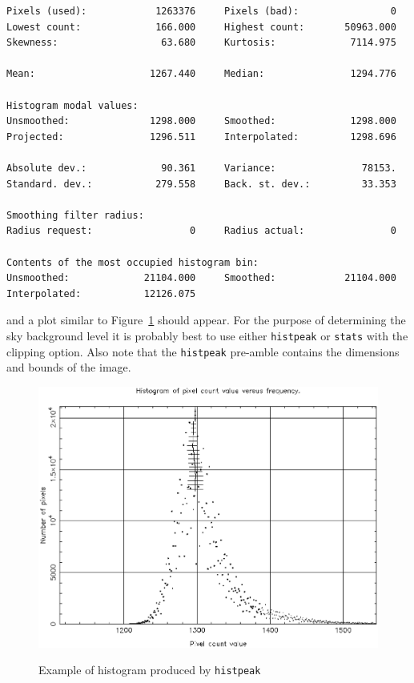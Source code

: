 \documentclass[twoside,11pt]{article}
\begin{document}
\begin{enumerate}
\begin{verbatim}
Pixels (used):            1263376     Pixels (bad):                0
Lowest count:             166.000     Highest count:       50963.000
Skewness:                  63.680     Kurtosis:             7114.975

Mean:                    1267.440     Median:               1294.776

Histogram modal values:
Unsmoothed:              1298.000     Smoothed:             1298.000
Projected:               1296.511     Interpolated:         1298.696

Absolute dev.:             90.361     Variance:               78153.
Standard. dev.:           279.558     Back. st. dev.:         33.353

Smoothing filter radius:
Radius request:                 0     Radius actual:               0

Contents of the most occupied histogram bin:
Unsmoothed:             21104.000     Smoothed:            21104.000
Interpolated:           12126.075
\end{verbatim}

   and a plot similar to Figure~\ref{HISTPEAK} should appear.  For the
   purpose of determining the sky background level it is probably best
   to use either {\tt histpeak} or {\tt stats} with the clipping option.
   Also note that the {\tt histpeak} pre-amble contains the dimensions and
   bounds of the image.

\end{enumerate}

\begin{figure}[htbp]
   \centering 
   \includegraphics[totalheight=4in]{sc5_histpeak.ps}
   \begin{quote}
   \caption{Example of histogram produced by {\tt histpeak}
   \label{HISTPEAK} }
   \end{quote}
\end{figure}
\end{document}
